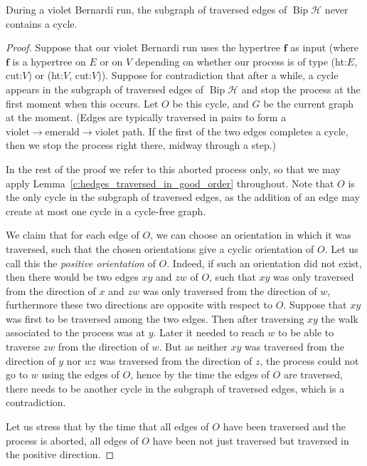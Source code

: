 \documentclass[ALCO,ThmDefs,Unicode,epreuves]{cedram}
\newcommand{\HH}{\mathcal H}
\DeclareMathOperator{\bip}{Bip}
\begin{document}
\begin{lemma} 
\label{l:no_cycl_in_Bernardi}
During a violet Bernardi run, the subgraph of traversed edges of $\bip \HH$ never contains a cycle.
\end{lemma}

\begin{proof}
Suppose that our violet Bernardi run uses the hypertree $\mathbf f$ as input (where $\mathbf f$ is a hypertree on $E$ or on $V$ depending on whether our process is of type (ht:$E$, cut:$V$) or (ht:$V$, cut:$V$)). Suppose for contradiction that after a while, a cycle appears in the subgraph of traversed edges of $\bip \HH$ and stop the process at the first moment when this occurs. Let $O$ be this cycle, and $G$ be the current graph at the moment. (Edges are typically traversed in pairs to form a $\text{violet}\to\text{emerald}\to\text{violet}$ path. If the first of the two edges completes a cycle, then we stop the process right there, midway through a step.)

In the rest of the proof we refer to this aborted process only, so that we may apply Lemma~\ref{c:hedges_traversed_in_good_order} throughout. Note that $O$ is the only cycle in the subgraph of traversed edges, as the addition of an edge may create at most one cycle in a cycle-free graph.

We claim that for each edge of $O$, we can choose an orientation in which it was traversed, such that the chosen orientations give a cyclic orientation of $O$. Let us call this the \emph{positive orientation} of $O$. Indeed, if such an orientation did not exist, then there would be two edges $xy$ and $zw$ of $O$, such that $xy$ was only traversed from the direction of $x$ and $zw$ was only traversed from the direction of $w$, furthermore these two directions are opposite with respect to $O$. Suppose that $xy$ was first to be traversed among the two edges. Then after traversing $xy$ the walk associated to the process was at $y$. Later it needed to reach $w$ to be able to traverse $zw$ from the direction of $w$. But as neither $xy$ was traversed from the direction of $y$ nor $wz$ was traversed from the direction of $z$, the process could not go to $w$ using the edges of $O$, hence by the time the edges of $O$ are traversed, there needs to be another cycle in the subgraph of traversed edges, which is a contradiction.

Let us stress that by the time that all edges of $O$ have been traversed and the process is aborted, all edges of $O$ have been not just traversed but traversed in the positive direction.


\end{proof}
\end{document}
